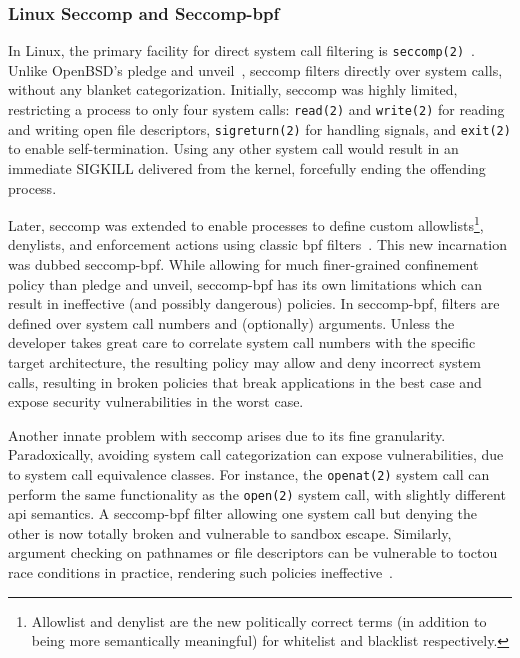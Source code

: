 \subsubsection*{Linux Seccomp and Seccomp-bpf}%
\label{sss:seccomp}

In Linux, the primary facility for direct system call filtering is
\texttt{seccomp(2)}~\cite{anderson2017_comparison, seccomp, prctl, edge2015_seccomp}.
Unlike OpenBSD's pledge and unveil~\cite{pledge, unveil}, seccomp filters directly over
system calls, without any blanket categorization. Initially, seccomp was highly limited,
restricting a process to only four system calls: \texttt{read(2)} and \texttt{write(2)}
for reading and writing open file descriptors, \texttt{sigreturn(2)} for handling signals,
and \texttt{exit(2)} to enable self-termination. Using any other system call would result
in an immediate SIGKILL delivered from the kernel, forcefully ending the offending
process.

Later, seccomp was extended to enable processes to define custom
allowlists\footnote{Allowlist and denylist are the new politically correct terms (in
addition to being more semantically meaningful) for whitelist and blacklist
respectively.}, denylists, and enforcement actions using classic \gls{bpf}
filters~\cite{edge2015_seccomp}. This new incarnation was dubbed seccomp-bpf.  While
allowing for much finer-grained confinement policy than pledge and unveil, seccomp-bpf has
its own limitations which can result in ineffective (and possibly dangerous) policies. In
seccomp-bpf, filters are defined over system call numbers and (optionally) arguments.
Unless the developer takes great care to correlate system call numbers with the specific
target architecture, the resulting policy may allow and deny incorrect system calls,
resulting in broken policies that break applications in the best case and expose security
vulnerabilities in the worst case.

Another innate problem with seccomp arises due to its fine granularity. Paradoxically,
avoiding system call categorization can expose vulnerabilities, due to system call
equivalence classes. For instance, the \texttt{openat(2)} system call can perform the same
functionality as the \texttt{open(2)} system call, with slightly different \gls{api} semantics.
A seccomp-bpf filter allowing one system call but denying the other is now totally broken
and vulnerable to sandbox escape.  Similarly, argument checking on pathnames or file
descriptors can be vulnerable to \gls{toctou} race conditions in practice, rendering such
policies ineffective~\cite{anderson2017_comparison}.

